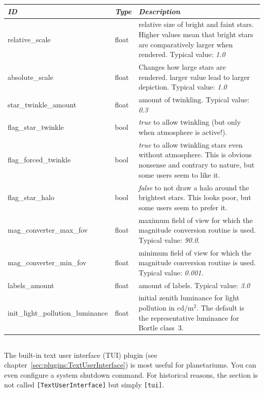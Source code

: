 \noindent%
\begin{tabularx}{\textwidth}{l|l|X}\toprule
\emph{ID}                & \emph{Type} & \emph{Description}\\\midrule
relative\_scale          & float       & relative size of bright and faint stars. Higher values mean that bright stars 
                                         are comparatively larger when rendered. Typical value: \emph{1.0}\\%
absolute\_scale          & float       & Changes how large stars are rendered. larger value lead to larger depiction. Typical value: \emph{1.0}\\%
star\_twinkle\_amount    & float       & amount of twinkling. Typical value: \emph{0.3}\\%
flag\_star\_twinkle      & bool        & \emph{true} to allow twinkling (but only when atmosphere is active!).\\%
flag\_forced\_twinkle    & bool        & \emph{true} to allow twinkling stars even without atmosphere. This is obvious nonsense and contrary to nature, but some users seem to like it.\\%
flag\_star\_halo         & bool        & \emph{false} to not draw a halo around the brightest stars. This looks poor, but some users seem to prefer it.\\%
mag\_converter\_max\_fov & float       & maximum field of view for which the magnitude conversion routine is used. Typical value: \emph{90.0}.\\%
mag\_converter\_min\_fov & float       & minimum field of view for which the magnitude conversion routine is used. Typical value: \emph{0.001}.\\%
labels\_amount           & float       & amount of labels. Typical value: \emph{3.0}\\%
init\_light\_pollution\_luminance & float & initial zenith luminance for light pollution in $\mathrm{cd/m^2}$.
                                          The default is the representative luminance for Bortle class~3.\\\bottomrule
\end{tabularx}

\subsection{}

The built-in text user interface (TUI) plugin (see chapter~\ref{sec:plugins:TextUserInterface}) is most useful for planetariums. You can even configure a system shutdown command. 
For historical reasons, the section is not called \texttt{[TextUserInterface]} but simply \texttt{[tui]}.

